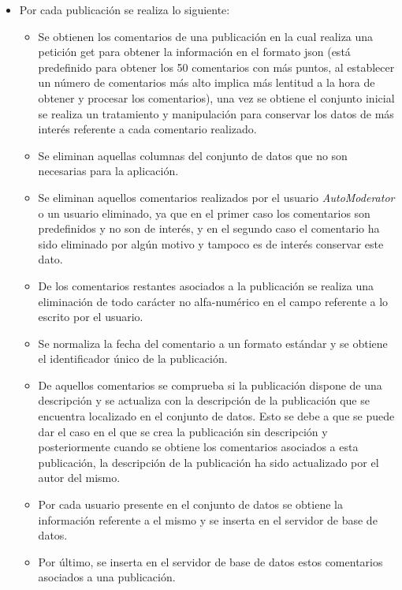 \documentclass[../../main.tex]{subfiles}
\begin{document}
\begin{itemize}
    \item Por cada publicación se realiza lo siguiente:
    \begin{itemize}
        \item Se obtienen los comentarios de una publicación en la cual realiza una petición \gls{get} para obtener la información en el formato \gls{json} (está predefinido para obtener los 50 comentarios con más puntos, al establecer un número de comentarios más alto implica más lentitud a la hora de obtener y procesar los comentarios), una vez se obtiene el conjunto inicial se realiza un tratamiento y manipulación para conservar los datos de más interés referente a cada comentario realizado.
        \item Se eliminan aquellas columnas del conjunto de datos que no son necesarias para la aplicación.
        \item Se eliminan aquellos comentarios realizados por el usuario \textit{AutoModerator} o un usuario eliminado, ya que en el primer caso los comentarios son predefinidos y no son de interés, y en el segundo caso el comentario ha sido eliminado por algún motivo y tampoco es de interés conservar este dato.
        \item De los comentarios restantes asociados a la publicación se realiza una eliminación de todo carácter no alfa-numérico en el campo referente a lo escrito por el usuario.
        \item Se normaliza la fecha del comentario a un formato estándar y se obtiene el identificador único de la publicación.
        \item De aquellos comentarios se comprueba si la publicación dispone de una descripción y se actualiza con la descripción de la publicación que se encuentra localizado en el conjunto de datos. Esto se debe a que se puede dar el caso en el que se crea la publicación sin descripción y posteriormente cuando se obtiene los comentarios asociados a esta publicación, la descripción de la publicación ha sido actualizado por el autor del mismo.
        \item Por cada usuario presente en el conjunto de datos se obtiene la información referente a el mismo y se inserta en el servidor de base de datos.
        \item Por último, se inserta en el servidor de base de datos estos comentarios asociados a una publicación.
    \end{itemize}
\end{itemize}
\end{document}
